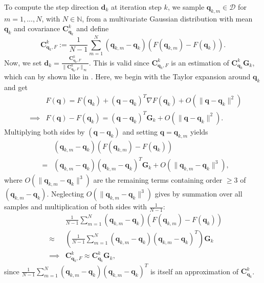 To compute the step direction $\mathbf{d}_k$ at iteration step $k$, we sample $\mathbf{q}_{k,m}\in\mathcal{D}$ for $m=1,...,N$, with $N\in\mathbb{N}$, from a multivariate Gaussian distribution with mean $\mathbf{q}_k$ and covariance $\mathbf{C}_{\mathbf{q}_k}^k$ and define
\begin{displaymath}
\mathbf{C}_{\mathbf{q}_k,F}^k:=\frac{1}{N-1}\sum_{m=1}^N(\mathbf{q}_{k,m}-\mathbf{q}_k)(F(\mathbf{q}_{k,m})-F(\mathbf{q}_k)).
\end{displaymath}
Now, we set $\mathbf{d}_k=\frac{\mathbf{C}_{\mathbf{q}_k,F}^k}{\|\mathbf{C}_{\mathbf{q}_k,F}^k\|_\infty}$. This is valid since $\mathbf{C}_{\mathbf{q}_k,F}^k$ is an estimation of $\mathbf{C}_{\mathbf{q}_k}^k\mathbf{G}_k$, which can by shown like in \cite{OGUNTOLA2021109165}. Here, we begin with the Taylor expansion around $\mathbf{q}_k$ and get
\begin{eqnarray*}
&&F(\mathbf{q})=F(\mathbf{q}_k)+(\mathbf{q}-\mathbf{q}_k)^T\nabla F(\mathbf{q}_k)+O(\|\mathbf{q}-\mathbf{q}_k\|^2)\\
&\implies&F(\mathbf{q})-F(\mathbf{q}_k)=(\mathbf{q}-\mathbf{q}_k)^T\mathbf{G}_k+O(\|\mathbf{q}-\mathbf{q}_k\|^2).
\end{eqnarray*}
Multiplying both sides by $(\mathbf{q}-\mathbf{q}_k)$ and setting $\mathbf{q}=\mathbf{q}_{k,m}$ yields
\begin{eqnarray*}
&&(\mathbf{q}_{k,m}-\mathbf{q}_k)(F(\mathbf{q}_{k,m})-F(\mathbf{q}_k))\\
&=&(\mathbf{q}_{k,m}-\mathbf{q}_k)(\mathbf{q}_{k,m}-\mathbf{q}_k)^T\mathbf{G}_k+O(\|\mathbf{q}_{k,m}-\mathbf{q}_k\|^3),
\end{eqnarray*}
where $O(\|\mathbf{q}_{k,m}-\mathbf{q}_k\|^3)$ are the remaining terms containing order $\geq3$ of $(\mathbf{q}_{k,m}-\mathbf{q}_k)$. Neglecting $O(\|\mathbf{q}_{k,m}-\mathbf{q}_k\|^3)$ gives by summation over all samples and multiplication of both sides with $\frac{1}{N-1}$:
\begin{eqnarray*}
&&\frac{1}{N-1}\sum_{m=1}^N(\mathbf{q}_{k,m}-\mathbf{q}_k)(F(\mathbf{q}_{k,m})-F(\mathbf{q}_k))\\
&\approx&\left(\frac{1}{N-1}\sum_{m=1}^N(\mathbf{q}_{k,m}-\mathbf{q}_k)(\mathbf{q}_{k,m}-\mathbf{q}_k)^T\right)\mathbf{G}_k\\
&\implies&\mathbf{C}_{\mathbf{q}_k,F}^k\approx\mathbf{C}_{\mathbf{q}_k}^k\mathbf{G}_k,
\end{eqnarray*}
since $\frac{1}{N-1}\sum_{m=1}^N(\mathbf{q}_{k,m}-\mathbf{q}_k)(\mathbf{q}_{k,m}-\mathbf{q}_k)^T$ is itself an approximation of $\mathbf{C}_{\mathbf{q}_k}^k$.\\

